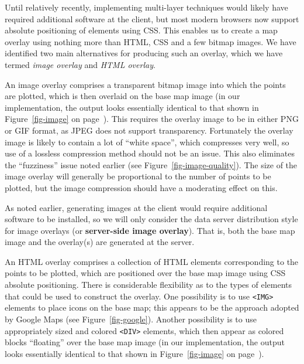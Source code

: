 \documentclass[acmtocl,acmnow]{acmtrans2m}
\begin{document}
Until relatively recently, implementing multi-layer techniques would likely
have required additional software at the client, but most modern
browsers now support absolute positioning of elements using CSS. This
enables us to create a map overlay using nothing more than HTML, CSS and
a few bitmap images. We have identified two main alternatives for
producing such an overlay, which we have termed \emph{image overlay} and
\emph{HTML overlay}.

An image overlay comprises a transparent bitmap image into which the
points are plotted, which is then overlaid on the base map image (in our
implementation, the output looks essentially identical to that shown in
Figure~\ref{fig-image} on page~\pageref{fig-image}). This requires the
overlay image to be in either PNG or GIF format, as JPEG does not
support transparency. Fortunately the overlay image is likely to contain
a lot of ``white space'', which compresses very well, so use of a
lossless compression method should not be an issue. This also eliminates
the ``fuzziness'' issue noted earlier (see
Figure~\ref{fig-image-quality}). The size of the image overlay will
generally be proportional to the number of points to be plotted, but the
image compression should have a moderating effect on this.

As noted earlier, generating images at the client would require
additional software to be installed, so we will only consider the data
server distribution style for image overlays (or \textbf{server-side
image overlay}). That is, both the base map image and the overlay(s) are
generated at the server.

An HTML overlay comprises a collection of HTML elements corresponding to
the points to be plotted, which are positioned over the base map image
using CSS absolute positioning. There is considerable flexibility as to
the types of elements that could be used to construct the overlay. One
possibility is to use \verb|<IMG>| elements to place icons on the base
map; this appears to be the approach adopted by Google Maps (see
Figure~\ref{fig-google}). Another possibility is to use appropriately
sized and colored \verb|<DIV>| elements, which then appear as colored
blocks ``floating'' over the base map image (in our implementation, the
output looks essentially identical to that shown in
Figure~\ref{fig-image} on page~\pageref{fig-image}).
\end{document}
